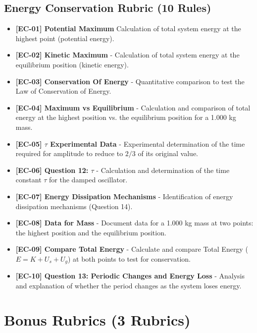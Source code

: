 \documentclass{article}
\begin{document}
\subsection*{Energy Conservation Rubric (10 Rules)}
\begin{itemize}
\item \textbf{ [EC-01] Potential Maximum } Calculation of total system energy at the highest point (potential energy).
\item \textbf{ [EC-02] Kinetic Maximum } - Calculation of total system energy at the equilibrium position (kinetic energy).
\item \textbf{ [EC-03] Conservation Of Energy } - Quantitative comparison to test the Law of Conservation of Energy.
\item \textbf{ [EC-04] Maximum vs Equilibrium } - Calculation and comparison of total energy at the highest position vs. the equilibrium position for a 1.000 kg mass.
\item \textbf{ [EC-05]  $\tau$ Experimental Data } - Experimental determination of the time required for amplitude to reduce to $2/3$ of its original value.
\item \textbf{ [EC-06] Question 12: $\tau$ } - Calculation and determination of the time constant $\tau$ for the damped oscillator.
\item \textbf{ [EC-07] Energy Dissipation Mechanisms } - Identification of energy dissipation mechanisms (Question 14).
\item \textbf{ [EC-08] Data for Mass } - Document data for a 1.000 kg mass at two points: the highest position and the equilibrium position.
\item \textbf{ [EC-09] Compare Total Energy } - Calculate and compare Total Energy ($E = K + U_s + U_g$) at both points to test for conservation.    
\item \textbf{ [EC-10] Question 13: Periodic Changes and Energy Loss }  - Analysis and explanation of whether the period changes as the system loses energy.
\end{itemize}

\section*{Bonus Rubrics (3 Rubrics)}
\end{document}
